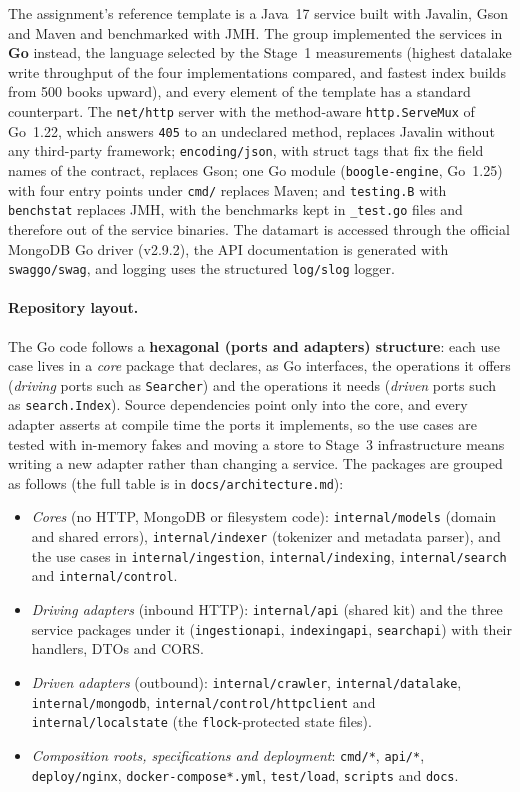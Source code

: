 \documentclass[10pt,a4paper]{article}
\newcommand{\code}[1]{\texttt{#1}}
\begin{document}
The assignment's reference template is a Java~17 service built with Javalin,
Gson and Maven and benchmarked with JMH. The group implemented the services in
\textbf{Go} instead, the language selected by the Stage~1 measurements
(highest datalake write throughput of the four implementations compared, and
fastest index builds from 500 books upward), and every element of the template
has a standard counterpart. The \code{net/http} server with the method-aware
\code{http.ServeMux} of Go~1.22, which answers \code{405} to an undeclared
method, replaces Javalin without any third-party framework;
\code{encoding/json}, with struct tags that fix the field names of the
contract, replaces Gson; one Go module (\code{boogle-engine}, Go~1.25) with
four entry points under \code{cmd/} replaces Maven; and \code{testing.B} with
\code{benchstat} replaces JMH, with the benchmarks kept in \code{\_test.go}
files and therefore out of the service binaries. The datamart is accessed
through the official MongoDB Go driver (v2.9.2), the API documentation is
generated with \code{swaggo/swag}, and logging uses the structured
\code{log/slog} logger.

\paragraph{Repository layout.}
The Go code follows a \textbf{hexagonal (ports and adapters) structure}: each
use case lives in a \emph{core} package that declares, as Go interfaces, the
operations it offers (\emph{driving} ports such as \code{Searcher}) and the
operations it needs (\emph{driven} ports such as \code{search.Index}). Source
dependencies point only into the core, and every adapter asserts at compile
time the ports it implements, so the use cases are tested with in-memory fakes
and moving a store to Stage~3 infrastructure means writing a new adapter rather
than changing a service. The packages are grouped as follows (the full table is
in \code{docs/architecture.md}):

\begin{itemize}
  \item \emph{Cores} (no HTTP, MongoDB or filesystem code): \code{internal/models}
    (domain and shared errors), \code{internal/indexer} (tokenizer and metadata
    parser), and the use cases in \code{internal/ingestion},
    \code{internal/indexing}, \code{internal/search} and
    \code{internal/control}.
  \item \emph{Driving adapters} (inbound HTTP): \code{internal/api} (shared
    kit) and the three service packages under it (\code{ingestionapi},
    \code{indexingapi}, \code{searchapi}) with their handlers, DTOs and CORS.
  \item \emph{Driven adapters} (outbound): \code{internal/crawler},
    \code{internal/datalake}, \code{internal/mongodb},
    \code{internal/control/httpclient} and \code{internal/localstate} (the
    \code{flock}-protected state files).
  \item \emph{Composition roots, specifications and deployment}: \code{cmd/*},
    \code{api/*}, \code{deploy/nginx}, \code{docker-compose*.yml},
    \code{test/load}, \code{scripts} and \code{docs}.
\end{itemize}
\end{document}
